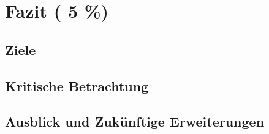 \chapter{Fazit ( 5 \%)}
\section{Ziele}
\section{Kritische Betrachtung}
\section{Ausblick und Zukünftige Erweiterungen}
